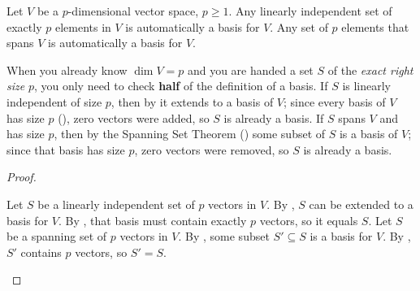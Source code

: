 \documentclass[10pt]{scrartcl}
\begin{document}
\begin{theorem*}
  Let $V$ be a $p$-dimensional vector space, $p\ge 1$. Any linearly independent set of exactly $p$ elements in $V$ is automatically a basis for $V$. Any set of $p$ elements that spans $V$ is automatically a basis for $V$.
\end{theorem*}
\begin{ideabox}
  When you already know $\dim V=p$ and you are handed a set $S$ of the \emph{exact right size} $p$, you only need to check \textbf{half} of the definition of a basis. If $S$ is linearly independent of size $p$, then by  it extends to a basis of $V$; since every basis of $V$ has size $p$ (), zero vectors were added, so $S$ is already a basis. If $S$ spans $V$ and has size $p$, then by the Spanning Set Theorem () some subset of $S$ is a basis of $V$; since that basis has size $p$, zero vectors were removed, so $S$ is already a basis.
\end{ideabox}
\begin{proof}
  \begin{steps}
    \ii Let $S$ be a linearly independent set of $p$ vectors in $V$. By , $S$ can be extended to a basis for $V$. By , that basis must contain exactly $p$ vectors, so it equals $S$.
    \ii Let $S$ be a spanning set of $p$ vectors in $V$. By , some subset $S'\subseteq S$ is a basis for $V$. By , $S'$ contains $p$ vectors, so $S'=S$.
  \end{steps}
\end{proof}
\end{document}
